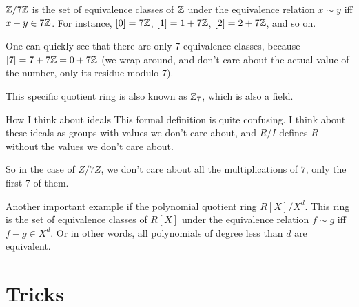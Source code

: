 \begin{example}
    $\mathbb{Z}/7\mathbb{Z}$ is the set of equivalence classes of $\mathbb{Z}$ under the equivalence relation
    $x\sim y$ iff $x-y\in 7\mathbb{Z}$. 
    For instance, $[0]=7\mathbb{Z}$, $[1]=1+7\mathbb{Z}$, $[2]=2+7\mathbb{Z}$, and so on.

    One can quickly see that there are only 7 equivalence classes, because $[7]=7+7\mathbb{Z}=0+7\mathbb{Z}$ (we wrap around, 
    and don't care about the actual value of the number, only its residue modulo 7).

    This specific quotient ring is also known as $\mathbb{Z}_7$, which is also a field.
\end{example}


\begin{bclogo}[logo=\bcinfo, couleurBarre=orange, noborder=true, couleur=white]{How I think about ideals}
    This formal definition is quite confusing. I think about these ideals as groups 
    with values we don't care about, and $R/I$ defines $R$ without 
    the values we don't care about.

    So in the case of $Z/7Z$, we don't care about 
    all the multiplications of $7$, only the first 7 of them.
\end{bclogo}


Another important example if the polynomial quotient ring $R[X]/X^d$. 
This ring is the set of equivalence classes of $R[X]$ under the equivalence relation
$f\sim g$ iff $f-g\in X^d$. Or in other words, all polynomials of degree less than $d$ are equivalent.


\section{Tricks}
